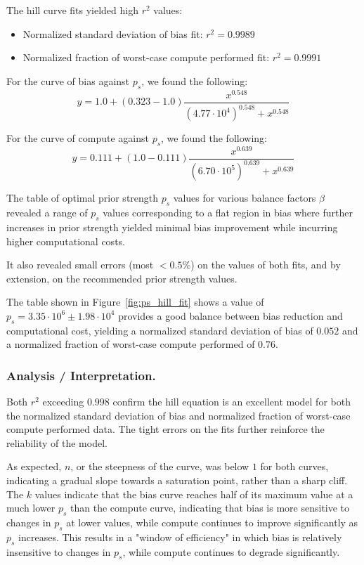     The hill curve fits yielded high $r^2$ values:
    \begin{itemize}
        \item Normalized standard deviation of bias fit: $r^2 = 0.9989$
        \item Normalized fraction of worst-case compute performed fit: $r^2 = 0.9991$
    \end{itemize}

    For the curve of bias against $p_s$, we found the following:
    \[
        y = 1.0 + (0.323 - 1.0) \frac{x^0.548}{(4.77 \cdot 10^4)^0.548 + x^0.548}
    \]

    For the curve of compute against $p_s$, we found the following:
    \[
        y = 0.111 + (1.0 - 0.111) \frac{x^{0.639}}{(6.70 \cdot 10^5)^{0.639} + x^{0.639}}
    \]

    The table of optimal prior strength $p_s$ values for various balance factors $\beta$ revealed a range of $p_s$ values corresponding to a flat region in bias where further increases in prior strength yielded minimal bias improvement while incurring higher computational costs.

    It also revealed small errors (most $<0.5\%$) on the values of both fits, and by extension, on the recommended prior strength values.

    The table shown in Figure~\ref{fig:ps_hill_fit} shows a value of $p_s = 3.35 \cdot 10^{6} \pm 1.98 \cdot 10^{4}$ 
    provides a good balance between bias reduction and computational cost, yielding a normalized standard deviation of bias of $0.052$ and a normalized fraction of worst-case compute performed of $0.76$.

    \subsubsection{Analysis / Interpretation.}

    Both $r^2$ exceeding $0.998$ confirm the hill equation is an excellent model for both the normalized standard deviation of bias and normalized fraction of worst-case compute performed data. The tight errors on the fits further reinforce the reliability of the model.

    As expected, $n$, or the steepness of the curve, was below $1$ for both curves, indicating a gradual slope towards a saturation point, rather than a sharp cliff. The $k$ values indicate that the bias curve reaches half of its maximum value at a much lower $p_s$ than the compute curve, indicating that bias is more sensitive to changes in $p_s$ at lower values, while compute continues to improve significantly as $p_s$ increases. This results in a "window of efficiency" in which bias is relatively insensitive to changes in $p_s$, while compute continues to degrade significantly.

